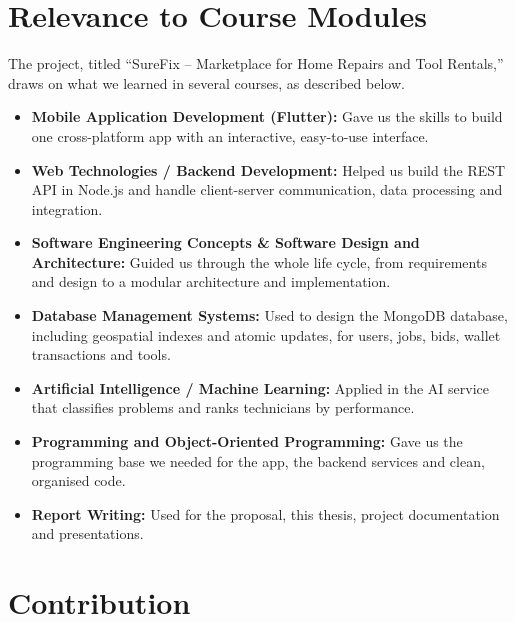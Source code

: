 \documentclass[A4paper,12pt]{report}
\theoremstyle{plain}
\theoremstyle{definition}
\theoremstyle{remark}
\numberwithin{equation}{section}
\begin{document}
\section{Relevance to Course Modules}
The project, titled “SureFix – Marketplace for Home Repairs and Tool Rentals,” draws on what we learned in several courses, as described below.
\begin{itemize}
    \item \textbf{Mobile Application Development (Flutter):} Gave us the skills to build one cross-platform app with an interactive, easy-to-use interface.
    \item \textbf{Web Technologies / Backend Development:} Helped us build the REST API in Node.js and handle client-server communication, data processing and integration.
    \item \textbf{Software Engineering Concepts \& Software Design and Architecture:} Guided us through the whole life cycle, from requirements and design to a modular architecture and implementation.
        \item \textbf{Database Management Systems:} Used to design the MongoDB database, including geospatial indexes and atomic updates, for users, jobs, bids, wallet transactions and tools.
    \item \textbf{Artificial Intelligence / Machine Learning:} Applied in the AI service that classifies problems and ranks technicians by performance.
    \item \textbf{Programming and Object-Oriented Programming:} Gave us the programming base we needed for the app, the backend services and clean, organised code.
    \item \textbf{Report Writing:} Used for the proposal, this thesis, project documentation and presentations.
\end{itemize}

\section{ Contribution }
\end{document}
